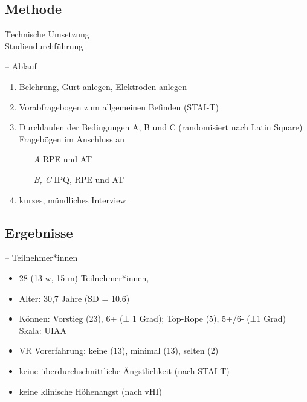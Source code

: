\subsection{Methode}

\begin{frame}[standout]
\begin{center}
			\parbox{0cm}{%
		\LARGE
		\begin{tabbing}
			 \quad \= Technische Umsetzung\\
			 \> Studiendurchführung
		\end{tabbing}}
\end{center}
\end{frame}

\begin{frame}{\currentname{} -- Ablauf}
	\begin{enumerate}[label=\textbf\textcolor{tertiary}{\theenumi}]
		\item Belehrung, Gurt anlegen, Elektroden anlegen
		\item Vorabfragebogen zum allgemeinen Befinden (STAI-T)
		\item Durchlaufen der Bedingungen A, B und C (randomisiert nach Latin Square)
		\\Fragebögen im Anschluss an
		\begin{itemize}
			\item[\textit{A}] \gls{RPE} und \gls{AT}
			\item[\textit{B, C}] \gls{IPQ}, \gls{RPE} und \gls{AT}
		\end{itemize}
		\item kurzes, mündliches Interview
	\end{enumerate}
\end{frame}

\subsection{Ergebnisse}

\begin{frame}{\currentname{} -- Teilnehmer*innen}
	\begin{itemize}[label=\textcolor{tertiary}{}]
		\item 28 (13 w, 15 m) Teilnehmer*innen, 
		\item Alter: 30,7 Jahre (SD = 10.6)
		\item Können: Vorstieg (23), 6+ (± 1 Grad); Top-Rope (5), 5+/6- (±1 Grad) \textcolor{source}{Skala: UIAA}
		\item VR Vorerfahrung: keine (13), minimal (13), selten (2)
		\item keine überdurchschnittliche Ängstlichkeit (nach STAI-T)
		\item keine klinische Höhenangst (nach vHI)
	\end{itemize}
\end{frame}

